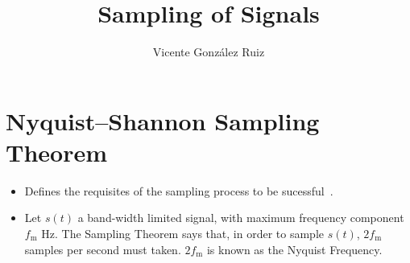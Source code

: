 \title{Sampling of Signals}
\author{Vicente González Ruiz}
\maketitle
\tableofcontents

\section{Nyquist–Shannon Sampling Theorem}
\begin{itemize}
\item Defines the requisites of the sampling process to be sucessful~\cite{oppenheim2014discrete, lathi1998modern}.
\item Let $s(t)$ a band-width limited signal, with maximum frequency
  component $f_{\text{m}}$ Hz. The Sampling Theorem says that, in
  order to sample $s(t)$, $2f_{\text{m}}$ samples per second must
  taken.  $2f_{\text{m}}$ is known as the Nyquist Frequency.
\end{itemize}

